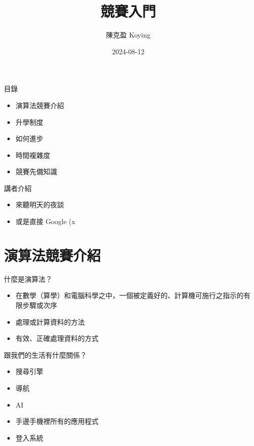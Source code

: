 \documentclass[aspectratio=169]{beamer}
\title{競賽入門}
\author{陳克盈 Koying}
\date{2024-08-12}
\begin{document}
    \begin{frame}
        \titlepage
    \end{frame}
    
    \begin{frame}{目錄}
    	\begin{itemize}
    		\item 演算法競賽介紹
    		\item 升學制度
    		\item 如何進步
    		\item 時間複雜度
    		\item 競賽先備知識
    	\end{itemize}
    \end{frame}

	\begin{frame}{講者介紹}
		\begin{itemize}
			\item 來聽明天的夜談
			\item 或是直接 Google (x
		\end{itemize}
	\end{frame}
    
	\section{演算法競賽介紹} 
    
    \begin{frame}{什麼是演算法？}
    	\begin{itemize}
    		\item 在數學（算學）和電腦科學之中，一個被定義好的、計算機可施行之指示的有限步驟或次序
    		\item 處理或計算資料的方法
    		\item 有效、正確處理資料的方式
    	\end{itemize}
    \end{frame}
    
    \begin{frame}{跟我們的生活有什麼關係？}
    	\begin{itemize}
    		\item 搜尋引擎
	    	\item 導航
	    	\item AI
    		\item 手邊手機裡所有的應用程式
    		\item 登入系統
    	\end{itemize}
    	
    \end{frame}
    
\end{document}
